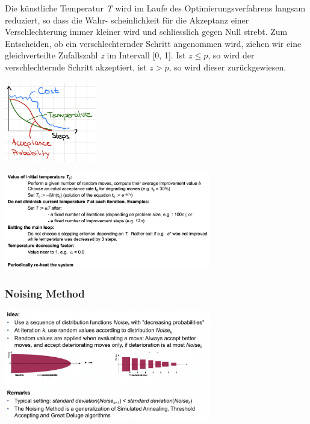 \documentclass[10pt,a4paper,twocolumn]{article}
\begin{document}
Die künstliche Temperatur \textit{T} wird im Laufe des Optimierungsverfahrens langsam reduziert, so dass die Wahr- scheinlichkeit für die Akzeptanz einer Verschlechterung immer kleiner wird und schliesslich gegen Null strebt. Zum Entscheiden, ob ein verschlechternder Schritt angenommen wird, ziehen wir eine gleichverteilte Zufallszahl \textit{z} im Intervall [0, 1]. Ist $z \leq p$, so wird der verschlechternde Schritt akzeptiert, ist $z > p$, so wird dieser zurückgewiesen.

\begin{center}
\includegraphics[width=4cm]{images/graph-simulated-annealing}
\end{center}

\begin{center}
\includegraphics[width=9cm]{images/tips-simulated-annealing}
\end{center}

\subsubsection{Noising Method}
\begin{center}
\includegraphics[width=9cm]{images/noising-method}
\end{center}
\end{document}
